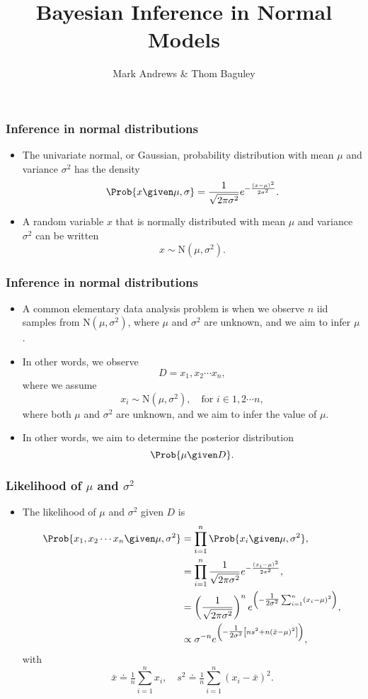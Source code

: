 \documentclass{slides}
\title[Bayesian Inference]{Bayesian Inference in Normal Models}
\author[Andrews]{Mark Andrews \& Thom Baguley}
\begin{document}
{
	\begin{frame}
		\titlepage
	\end{frame}
}


\begin{frame}
	\frametitle{Inference in normal distributions}
	\begin{itemize}
		\item The univariate normal, or Gaussian, probability distribution with mean $\mu$ and variance $\sigma^2$ has the density
			\[
				\Prob{x\given\mu,\sigma} = \frac{1}{\sqrt{2\pi\sigma^2}}e^{-\frac{(x-\mu)^2}{2\sigma^2}}.
			\]
		\item A random variable $x$ that is normally distributed with mean $\mu$ and variance $\sigma^2$ can be written
			\[
				x \sim \textrm{N}(\mu, \sigma^2).
			\]

	\end{itemize}
\end{frame}

\begin{frame}
	\frametitle{Inference in normal distributions}
	\begin{itemize}
		\item A common elementary data analysis problem is when we
			observe $n$ iid samples from $\textrm{N}(\mu, \sigma^2)$, where
			$\mu$ and $\sigma^2$ are unknown, and we aim to infer
			$\mu$.

		\item In other words, we observe
			\[D = x_1, x_2 \cdots x_n,\]
			where we assume
			\[x_i \sim \textrm{N}(\mu, \sigma^2),\quad\text{for $i \in 1,2\cdots n$},\]
		      where both $\mu$ and $\sigma^2$ are unknown, and we aim to infer the value of $\mu$. 
		\item In other words, we aim to determine the posterior distribution
		      \[
			\Prob{\mu \given D}.
		      \]
	\end{itemize}
\end{frame}


\begin{frame}
	\frametitle{Likelihood of $\mu$ and $\sigma^2$}
	\begin{itemize}
		\item The likelihood of $\mu$ and $\sigma^2$ given $D$ is 
			\begin{align*}
				\Prob{x_1, x_2 \cdots x_n \given \mu, \sigma^2} &= \prod_{i=1}^n \Prob{x_i \given \mu, \sigma^2},\\
				&= \prod_{i=1}^n \frac{1}{\sqrt{2\pi\sigma^2}}e^{-\frac{(x_i-\mu)^2}{2\sigma^2}},\\
				&= \left(\frac{1}{\sqrt{2\pi\sigma^2}}\right)^n e^{\left(-\tfrac{1}{2\sigma^2}\sum_{i=1}^{n}(x_i - \mu)^2\right)},\\
				&\propto \sigma^{-n} e^{\left( -\tfrac{1}{2\sigma^2}\left[n s^2 + n(\bar{x}-\mu)^2\right] \right)},
			\end{align*}
			with \[
				\bar{x} \doteq \tfrac{1}{n} \sum_{i=1}^n x_i, \quad s^2 \doteq \tfrac{1}{n} \sum_{i=1}^n (x_i - \bar{x})^2.
			\]
	\end{itemize}

\end{frame}
\end{document}
